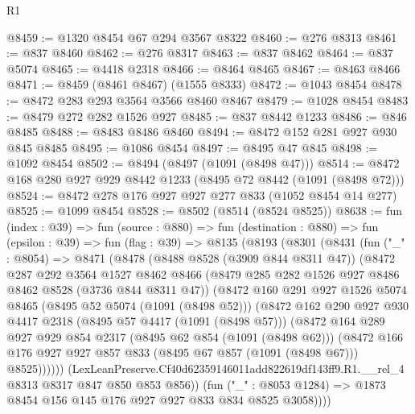 \begin{lexlean}{R1}
\begin{coremodule}
@8459 := @1320 @8454 @67 @294 @3567 @8322
@8460 := @276 @8313
@8461 := @837 @8460
@8462 := @276 @8317
@8463 := @837 @8462
@8464 := @837 @5074
@8465 := @4418 @2318
@8466 := @8464 @8465
@8467 := @8463 @8466
@8471 := @8459 (@8461 @8467) (@1555 @8333)
@8472 := @1043 @8454
@8478 := @8472 @283 @293 @3564 @3566 @8460 @8467
@8479 := @1028 @8454
@8483 := @8479 @272 @282 @1526 @927
@8485 := @837 @8442 @1233
@8486 := @846 @8485
@8488 := @8483 @8486 @8460
@8494 := @8472 @152 @281 @927 @930 @845 @8485
@8495 := @1086 @8454
@8497 := @8495 @47 @845
@8498 := @1092 @8454
@8502 := @8494 (@8497 (@1091 (@8498 @47)))
@8514 := @8472 @168 @280 @927 @929 @8442 @1233 (@8495 @72 @8442 (@1091 (@8498 @72)))
@8524 := @8472 @278 @176 @927 @927 @277 @833 (@1052 @8454 @14 @277)
@8525 := @1099 @8454
@8528 := @8502 (@8514 (@8524 @8525))
@8638 := fun (index : @39) =>
  fun (source : @880) =>
  fun (destination : @880) =>
  fun (epsilon : @39) =>
  fun (flag : @39) =>
  @8135
    (@8193
      (@8301
        (@8431
          (fun ("_" : @8054) =>
          @8471
            (@8478
              (@8488 @8528 (@3909 @844 @8311 @47))
              (@8472
                @287
                @292
                @3564
                @1527
                @8462
                @8466
                (@8479 @285 @282 @1526 @927 @8486 @8462 @8528 (@3736 @844 @8311 @47))
                (@8472
                  @160
                  @291
                  @927
                  @1526
                  @5074
                  @8465
                  (@8495 @52 @5074 (@1091 (@8498 @52)))
                  (@8472
                    @162
                    @290
                    @927
                    @930
                    @4417
                    @2318
                    (@8495 @57 @4417 (@1091 (@8498 @57)))
                    (@8472
                      @164
                      @289
                      @927
                      @929
                      @854
                      @2317
                      (@8495 @62 @854 (@1091 (@8498 @62)))
                      (@8472
                        @166
                        @176
                        @927
                        @927
                        @857
                        @833
                        (@8495 @67 @857 (@1091 (@8498 @67)))
                        @8525))))))
            (LexLeanPreserve.Cf40d62359146011add822619df143ff9.R1.__rel_4
              @8313
              @8317
              @847
              @850
              @853
              @856))
          (fun ("_" : @8053 @1284) => @1873 @8454 @156 @145 @176 @927 @927 @833 @834 @8525 @3058))))

\end{coremodule}
\end{lexlean}
